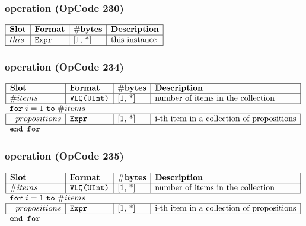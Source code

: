 \subsubsection{ operation (OpCode 230)}

\noindent
\(\begin{array}{| l | l | l | l |}
    \hline
    \bf{Slot} & \bf{Format} & \bf{\#bytes} & \bf{Description} \\
    \hline
         this & \lst{Expr} & \text{[1, *]} & \text{this instance} \\
    \hline
      
\end{array}\)
       

\subsubsection{ operation (OpCode 234)}

\noindent
\(\begin{array}{| l | l | l | l |}
    \hline
    \bf{Slot} & \bf{Format} & \bf{\#bytes} & \bf{Description} \\
    \hline
         \#items & \lst{VLQ(UInt)} & \text{[1, *]} & \text{number of items in the collection} \\
    \hline
          \multicolumn{4}{l}{\lst{for}~i=1~\lst{to}~\#items} \\
    \hline
             ~~ propositions & \lst{Expr} & \text{[1, *]} & \text{i-th item in a collection of propositions} \\
    \hline
          \multicolumn{4}{l}{\lst{end for}} \\
\end{array}\)
       

\subsubsection{ operation (OpCode 235)}

\noindent
\(\begin{array}{| l | l | l | l |}
    \hline
    \bf{Slot} & \bf{Format} & \bf{\#bytes} & \bf{Description} \\
    \hline
         \#items & \lst{VLQ(UInt)} & \text{[1, *]} & \text{number of items in the collection} \\
    \hline
          \multicolumn{4}{l}{\lst{for}~i=1~\lst{to}~\#items} \\
    \hline
             ~~ propositions & \lst{Expr} & \text{[1, *]} & \text{i-th item in a collection of propositions} \\
    \hline
          \multicolumn{4}{l}{\lst{end for}} \\
\end{array}\)
       

